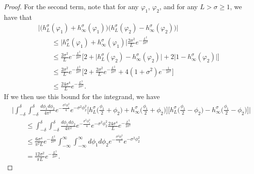 \documentclass[../thesis-main/thesis-main]{subfiles}
\begin{document}
\begin{proof}
For the second term, note that for any $\varphi_1$, $\varphi_2$, and for any $L > \sigma \geq 1$, we have that
\begin{align}
  &\big| \big(h_L^\sigma(\varphi_1) + h_{\infty}^\sigma(\varphi_1)\big)\big(h_L^\sigma(\varphi_2) - h_\infty^\sigma(\varphi_2) \big) \big| \nonumber\\
  &\qquad\leq \big| h_L^\sigma(\varphi_1) + h_{\infty}^\sigma(\varphi_1)\big| \frac{2\sigma^2}{L} e^{-\frac{L^2}{2\sigma^2}}\\
   & \qquad\leq \frac{2 \sigma^2}{L} e^{-\frac{L^2}{2\sigma^2} }\Big [ 2 + \big|h_L^\sigma (\varphi_2) - h_\infty^\sigma(\varphi_2) \big| + 2 \big| 1 - h_\infty^\sigma(\varphi_2) \big| \Big]\\
   & \qquad \leq  \frac{2 \sigma^2}{L} e^{-\frac{L^2}{2\sigma^2} }\Big [ 2 +   \frac{2 \sigma^2}{L} e^{-\frac{L^2}{2\sigma^2} }  + 4 (1 + \sigma^2) e^{ -\frac{1}{2\sigma^2}}\Big]\\
   & \qquad \leq \frac{24 \sigma^4}{L}  e^{ - \frac{L^2}{2\sigma^2}}.
\end{align}
If we then use this bound for the integrand, we have 
\begin{align}
  &\Bigg | \int_{-\delta}^\delta \int_{-\delta}^\delta \frac{d\phi_1 d\phi_2}{4\pi^2} e^{- \frac{\sigma^2 \phi_1^2}{4}}e^{-\sigma^2 \phi_2^2}  \Big[h_L^{\sigma} \Big(\frac{\phi_1}{2} + \phi_2 \Big)  + h_\infty^\sigma \Big(\frac{\phi_1}{2} + \phi_2 \Big)\Big] \Big[ h_{L}^\sigma\Big(\frac{\phi_1}{2} - \phi_2 \Big) - h_\infty^\sigma\Big(\frac{\phi_1}{2} - \phi_2\Big)\Big]\Bigg|\nonumber\\
  & \qquad \leq  \int_{-\delta}^\delta \int_{-\delta}^\delta \frac{d\phi_1 d\phi_2}{4\pi^2} e^{- \frac{\sigma^2 \phi_1^2}{4}}e^{-\sigma^2 \phi_2^2}  \frac{24 \sigma^4}{L}  e^{-\frac{L^2}{2\sigma^2}}\\
  & \qquad \leq \frac{6\sigma^4}{\pi^2 L}  e^{ - \frac{ L^2}{2\sigma^2}}\int_{-\infty}^\infty \int_{-\infty}^\infty  d\phi_1 d\phi_2 e^{- \frac{\sigma^2 \phi_1^2}{4}}e^{-\sigma^2 \phi_2^2}\\
  & \qquad = \frac{ 12 \sigma^2}{\pi L}  e^{ - \frac{L^2}{2\sigma^2}}.
\end{align}


\end{proof}
\end{document}
